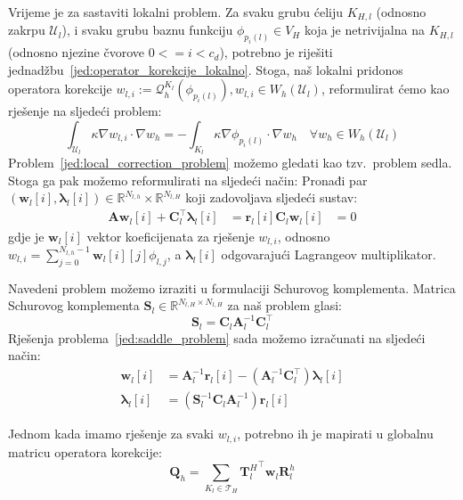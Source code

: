 \documentclass[zavrsnirad]{fer}
\begin{document}
Vrijeme je za sastaviti lokalni problem. Za svaku grubu ćeliju $K_{H,l}$ (odnosno zakrpu $\mathcal{U}_l$),
i svaku grubu baznu funkciju $\phi_{p_i(l)} \in V_H$ koja je netrivijalna na $K_{H,l}$ (odnosno njezine čvorove $0 <= i < c_d$),
potrebno je riješiti jednadžbu~\ref{jed:operator_korekcije_lokalno}. Stoga, naš lokalni pridonos operatora korekcije
$w_{l,i} := \mathcal{Q}_h^{K_l}(\phi_{p_i(l)}), w_{l,i} \in W_h(\mathcal{U}_l)$,
reformulirat ćemo kao rješenje na sljedeći problem:
\begin{equation}
  \label{jed:local_correction_problem}
  \int_{\mathcal{U}_l} \kappa \nabla w_{l,i} \cdot \nabla w_h = -\int_{K_l} \kappa \nabla \phi_{p_i(l)} \cdot \nabla w_h \quad \forall w_h \in W_h(\mathcal{U}_l)
\end{equation}
Problem\ \ref{jed:local_correction_problem} možemo gledati kao tzv.\ problem sedla.
Stoga ga pak možemo reformulirati na sljedeći način: Pronađi par $(\mathbf{w}_l[i], \bm{\lambda}_l[i]) \in \mathbb{R}^{N_{l,h}} \times \mathbb{R}^{N_{l,H}}$
koji zadovoljava sljedeći sustav:
\begin{align}
  \label{jed:saddle_problem}
  \mathbf{A} \mathbf{w}_l[i] + \mathbf{C}_l^\top \bm{\lambda}_l[i] &= \mathbf{r}_l[i]
  \mathbf{C}_l \mathbf{w}_l[i] &= 0
\end{align}
gdje je $\mathbf{w}_l[i]$ vektor koeficijenata za rješenje $w_{l,i}$,
odnosno $w_{l,i} = \sum_{j=0}^{N_{l,h} - 1} \mathbf{w}_l[i][j] \phi_{l,j}$,
a $\bm{\lambda}_l[i]$ odgovarajući Lagrangeov multiplikator.

Navedeni problem možemo izraziti u formulaciji Schurovog komplementa.
Matrica Schurovog komplementa $\mathbf{S}_l \in \mathbb{R}^{N_{l,H} \times N_{l,H}}$ za naš problem glasi:
\begin{equation}
  \label{jed:schur_complement}
  \mathbf{S}_l = \mathbf{C}_l \mathbf{A}_l^{-1} \mathbf{C}_l^\top
\end{equation}
Rješenja problema~\ref{jed:saddle_problem} sada možemo izračunati na sljedeći način:
\begin{align}
  \label{jed:saddle_solution}
  \mathbf{w}_l[i] &= \mathbf{A}_l^{-1} \mathbf{r}_l[i] - (\mathbf{A}_l^{-1} \mathbf{C}_l^\top) \bm{\lambda}_l[i] \\
  \bm{\lambda}_l[i] &= (\mathbf{S}_l^{-1} \mathbf{C}_l \mathbf{A}_l^{-1}) \mathbf{r}_l[i]
\end{align}

Jednom kada imamo rješenje za svaki $w_{l,i}$, potrebno ih je mapirati u globalnu matricu operatora korekcije:
\begin{equation}
  \label{jed:local_to_global_correction}
  \mathbf{Q}_h = \sum_{K_l \in \mathcal{T}_H} {\mathbf{T}_l^H}^\top \mathbf{w}_l \mathbf{R}_l^h
\end{equation}
\end{document}
